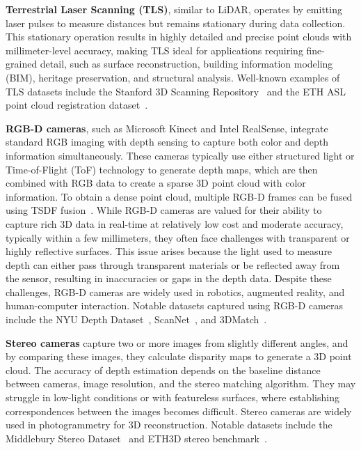 \textbf{Terrestrial Laser Scanning (TLS)}, similar to LiDAR, operates by emitting laser pulses to measure distances but remains stationary during data collection. This stationary operation results in highly detailed and precise point clouds with millimeter-level accuracy, making TLS ideal for applications requiring fine-grained detail, such as surface reconstruction, building information modeling (BIM), heritage preservation, and structural analysis. Well-known examples of TLS datasets include the Stanford 3D Scanning Repository~\cite{curless1996volumetric} and the ETH ASL point cloud registration dataset~\cite{Pomerleau_2012}.

\textbf{RGB-D cameras}, such as Microsoft Kinect and Intel RealSense, integrate standard RGB imaging with depth sensing to capture both color and depth information simultaneously. These cameras typically use either structured light or Time-of-Flight (ToF) technology to generate depth maps, which are then combined with RGB data to create a sparse 3D point cloud with color information. To obtain a dense point cloud, multiple RGB-D frames can be fused using TSDF fusion~\cite{curless1996volumetric,zeng20163dmatch}. While RGB-D cameras are valued for their ability to capture rich 3D data in real-time at relatively low cost and moderate accuracy, typically within a few millimeters, they often face challenges with transparent or highly reflective surfaces. This issue arises because the light used to measure depth can either pass through transparent materials or be reflected away from the sensor, resulting in inaccuracies or gaps in the depth data. Despite these challenges, RGB-D cameras are widely used in robotics, augmented reality, and human-computer interaction. Notable datasets captured using RGB-D cameras include the NYU Depth Dataset~\cite{Silberman_ECCV12}, ScanNet~\cite{dai2017scannet}, and 3DMatch~\cite{zeng20163dmatch}.

\textbf{Stereo cameras} capture two or more images from slightly different angles, and by comparing these images, they calculate disparity maps to generate a 3D point cloud. The accuracy of depth estimation depends on the baseline distance between cameras, image resolution, and the stereo matching algorithm. They may struggle in low-light conditions or with featureless surfaces, where establishing correspondences between the images becomes difficult. Stereo cameras are widely used in photogrammetry for 3D reconstruction. Notable datasets include the Middlebury Stereo Dataset~\cite{scharstein2002taxonomy} and ETH3D stereo benchmark~\cite{schops2017multi}.

